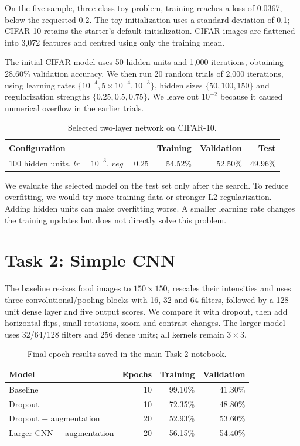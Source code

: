 \documentclass[11pt,a4paper]{article}
\begin{document}
On the five-sample, three-class toy problem, training reaches a loss of 0.0367,
below the requested 0.2. The toy initialization uses a standard deviation of
0.1; CIFAR-10 retains the starter's default initialization. CIFAR images are
flattened into 3,072 features and centred using only the training mean.

The initial CIFAR model uses 50 hidden units and 1,000 iterations, obtaining
28.60\% validation accuracy. We then run 20 random trials of 2,000 iterations,
using learning rates $\{10^{-4},5\times10^{-4},10^{-3}\}$, hidden sizes
$\{50,100,150\}$ and regularization strengths $\{0.25,0.5,0.75\}$.
We leave out $10^{-2}$ because it caused numerical overflow in the earlier trials.

\begin{table}[ht]
\centering
\small
\caption{Selected two-layer network on CIFAR-10.}
\begin{tabular}{lrrr}
\toprule
Configuration & Training & Validation & Test\\
\midrule
100 hidden units, $lr=10^{-3}$, $reg=0.25$ & 54.52\% & 52.50\% & 49.96\%\\
\bottomrule
\end{tabular}
\end{table}

We evaluate the selected model on the test set only after the search. To reduce
overfitting, we would try more training data or stronger L2 regularization.
Adding hidden units can make overfitting worse. A smaller learning rate changes
the training updates but does not directly solve this problem.

\clearpage
\section{Task 2: Simple CNN}
The baseline resizes food images to $150\times150$, rescales their intensities
and uses three convolutional/pooling blocks with 16, 32 and 64 filters, followed
by a 128-unit dense layer and five output scores. We compare it with dropout,
then add horizontal flips, small rotations, zoom and contrast changes. The
larger model uses 32/64/128 filters and 256 dense units; all kernels remain
$3\times3$.

\begin{table}[ht]
\centering
\small
\caption{Final-epoch results saved in the main Task 2 notebook.}
\begin{tabular}{lrrr}
\toprule
Model & Epochs & Training & Validation\\
\midrule
Baseline & 10 & 99.10\% & 41.30\%\\
Dropout & 10 & 72.35\% & 48.80\%\\
Dropout + augmentation & 20 & 52.93\% & 53.60\%\\
Larger CNN + augmentation & 20 & 56.15\% & 54.40\%\\
\bottomrule
\end{tabular}
\end{table}
\end{document}
